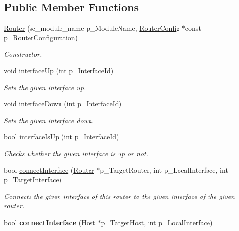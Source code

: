 \subsection*{Public Member Functions}
\begin{DoxyCompactItemize}
\item 
\hyperlink{classRouter_a9f15cc9e3d8349adfac38175ae9ebd64}{Router} (sc\-\_\-module\-\_\-name p\-\_\-\-Module\-Name, \hyperlink{classRouterConfig}{Router\-Config} $\ast$const p\-\_\-\-Router\-Configuration)
\begin{DoxyCompactList}\small\item\em Constructor. \end{DoxyCompactList}\item 
void \hyperlink{classRouter_a31324e31f2c02c9998afdbeeb9e34c08}{interface\-Up} (int p\-\_\-\-Interface\-Id)
\begin{DoxyCompactList}\small\item\em Sets the given interface up. \end{DoxyCompactList}\item 
void \hyperlink{classRouter_ae9c407addfa058a197d005ccc600b3e1}{interface\-Down} (int p\-\_\-\-Interface\-Id)
\begin{DoxyCompactList}\small\item\em Sets the given interface down. \end{DoxyCompactList}\item 
bool \hyperlink{classRouter_aff2f6f94c5d27c2b3eb6751475f82231}{interface\-Is\-Up} (int p\-\_\-\-Interface\-Id)
\begin{DoxyCompactList}\small\item\em Checks whether the given interface is up or not. \end{DoxyCompactList}\item 
bool \hyperlink{classRouter_a6d9dd4f4e1abc82e92ab082da52f2abd}{connect\-Interface} (\hyperlink{classRouter}{Router} $\ast$p\-\_\-\-Target\-Router, int p\-\_\-\-Local\-Interface, int p\-\_\-\-Target\-Interface)
\begin{DoxyCompactList}\small\item\em Connects the given interface of this router to the given interface of the given router. \end{DoxyCompactList}\item 
\hypertarget{classRouter_aad50fac7b3c4de2e91c60a07a2bc5928}{bool {\bfseries connect\-Interface} (\hyperlink{classHost}{Host} $\ast$p\-\_\-\-Target\-Host, int p\-\_\-\-Local\-Interface)}\label{classRouter_aad50fac7b3c4de2e91c60a07a2bc5928}


\end{DoxyCompactItemize}
